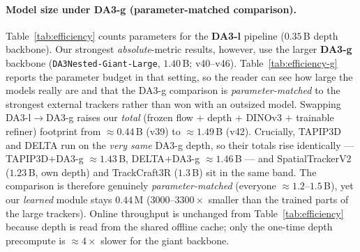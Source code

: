 \documentclass[11pt,a4paper]{article}
\begin{document}
\paragraph{Model size under DA3-g (parameter-matched comparison).}
Table~\ref{tab:efficiency} counts parameters for the \textbf{DA3-l} pipeline ($0.35$\,B depth backbone).
Our strongest \emph{absolute}-metric results, however, use the larger \textbf{DA3-g} backbone
(\texttt{DA3Nested-Giant-Large}, $1.40$\,B; v40--v46). Table~\ref{tab:efficiency-g} reports the parameter
budget in that setting, so the reader can see how large the models really are and that the DA3-g comparison
is \emph{parameter-matched} to the strongest external trackers rather than won with an outsized model.
Swapping DA3-l$\to$DA3-g raises our \emph{total} (frozen flow $+$ depth $+$ DINOv3 $+$ trainable refiner)
footprint from ${\approx}0.44$\,B (v39) to ${\approx}1.49$\,B (v42). Crucially, TAPIP3D and DELTA run on the
\emph{very same} DA3-g depth, so their totals rise identically --- TAPIP3D$+$DA3-g ${\approx}1.43$\,B,
DELTA$+$DA3-g ${\approx}1.46$\,B --- and SpatialTrackerV2 ($1.23$\,B, own depth) and TrackCraft3R ($1.3$\,B)
sit in the same band. The comparison is therefore genuinely \emph{parameter-matched} (everyone ${\approx}1.2$--$1.5$\,B),
yet our \emph{learned} module stays $0.44$\,M ($3000$--$3300\times$ smaller than the trained parts of the large
trackers). Online throughput is unchanged from Table~\ref{tab:efficiency} because depth is read from the shared
offline cache; only the one-time depth precompute is ${\approx}4\times$ slower for the giant backbone.
\end{document}
